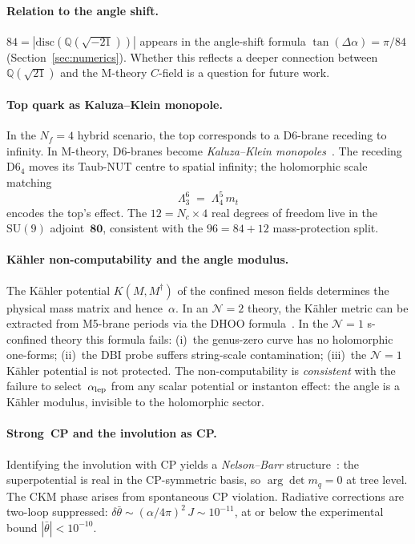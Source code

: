 \documentclass[12pt,a4paper]{article}
\newcommand{\SU}{\mathrm{SU}}
\newcommand{\Nf}{N_f}
\begin{document}
\paragraph{Relation to the angle shift.}
$84 = |\mathrm{disc}(\mathbb{Q}(\sqrt{-21}))|$
appears in the angle-shift formula $\tan(\Delta\alpha) = \pi/84$
(Section~\ref{sec:numerics}). Whether this reflects a deeper
connection between $\mathbb{Q}(\sqrt{21})$ and the M-theory
$C$-field is a question for future work.

\paragraph{Top quark as Kaluza--Klein monopole.}
In the $\Nf = 4$ hybrid scenario, the top
corresponds to a D6-brane receding to infinity. In M-theory, D6-branes become
\emph{Kaluza--Klein monopoles}~\cite{Townsend:1995}. The receding
D6$_4$ moves its Taub-NUT centre to spatial infinity;
the holomorphic scale matching
\begin{equation}
  \Lambda_3^6 \;=\; \Lambda_4^5\,m_t
  \label{eq:scale_matching}
\end{equation}
encodes the top's effect.
The $12 = N_c \times 4$ real degrees of freedom live in the
$\SU(9)$ adjoint~$\mathbf{80}$, consistent with the $96 = 84 + 12$
mass-protection split.

\paragraph{K\"ahler non-computability and the angle modulus.}
The K\"ahler potential $K(M, M^\dagger)$ of the confined meson
fields determines the physical mass matrix and hence~$\alpha$.
In an $\mathcal{N}=2$ theory, the K\"ahler metric can be extracted
from M5-brane periods via the DHOO
formula~\cite{deBoer:1997DHOO}. In the $\mathcal{N}=1$
s-confined theory this formula fails:
(i)~the genus-zero curve has no holomorphic one-forms;
(ii)~the DBI probe suffers string-scale contamination;
(iii)~the $\mathcal{N}=1$ K\"ahler potential is not protected.
The non-computability is \emph{consistent} with the failure to
select~$\alpha_{\rm lep}$ from any scalar potential or instanton
effect: the angle is a K\"ahler modulus, invisible to the
holomorphic sector.

\paragraph{Strong~CP and the involution as CP.}
Identifying the involution with CP yields a
\emph{Nelson--Barr} structure~\cite{Nelson:1984,Barr:1984}:
the superpotential is real in the CP-symmetric basis,
so $\arg\det m_q = 0$ at tree level.  The CKM phase
arises from spontaneous CP violation.
Radiative corrections are two-loop suppressed:
$\delta\bar\theta \sim (\alpha/4\pi)^2\,J
\sim 10^{-11}$, at or below the experimental
bound $|\bar\theta| < 10^{-10}$.
\end{document}
